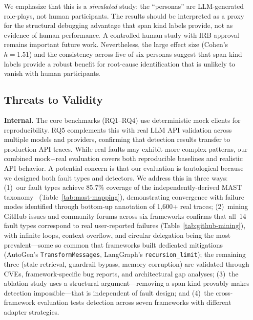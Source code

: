 \documentclass[sigplan,10pt,screen]{acmart}
\begin{document}
We emphasize that this is a \emph{simulated} study: the ``personas''
are LLM-generated role-plays, not human participants.  The results
should be interpreted as a proxy for the structural debugging advantage
that span kind labels provide, not as evidence of human performance.
A controlled human study with IRB approval remains important future
work.  Nevertheless, the large effect size (Cohen's $h=1.51$) and
the consistency across five of six personas suggest that span kind
labels provide a robust benefit for root-cause identification that
is unlikely to vanish with human participants.

\subsection{Threats to Validity}

\textbf{Internal.}  The core benchmarks (RQ1--RQ4) use deterministic mock clients
for reproducibility.  RQ5 complements this with real LLM API validation
across multiple models and providers, confirming that detection results
transfer to production API traces.  While real
faults may exhibit more complex patterns, our combined mock+real evaluation
covers both reproducible baselines and realistic API behavior.
A potential concern is that our evaluation is tautological because we designed
both fault types and detectors.  We address this in three ways: (1)~our fault
types achieve 85.7\% coverage of the independently-derived MAST
taxonomy~\cite{mast} (Table~\ref{tab:mast-mapping}), demonstrating convergence
with failure modes identified through bottom-up annotation of 1{,}600+ real
traces; (2)~mining GitHub issues and community forums across six frameworks
confirms that all~14 fault types correspond to real user-reported failures
(Table~\ref{tab:github-mining}), with infinite loops, context overflow, and
circular delegation being the most prevalent---some so common that frameworks
built dedicated mitigations (AutoGen's \texttt{TransformMessages}, LangGraph's
\texttt{recursion\_limit}); the remaining three (stale retrieval, guardrail
bypass, memory corruption) are validated through CVEs, framework-specific bug
reports, and architectural gap analyses; (3)~the ablation study uses a structural
argument---removing a span kind provably makes detection impossible---that is
independent of fault design; and (4)~the cross-framework evaluation tests
detection across seven frameworks with different adapter strategies.
\end{document}
